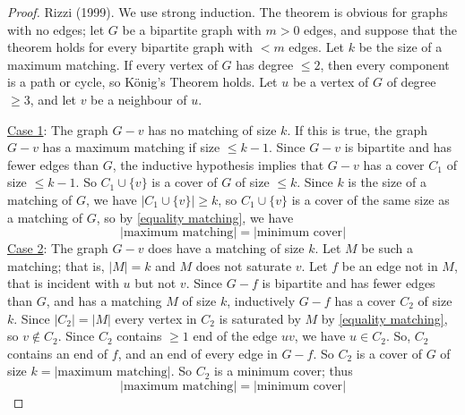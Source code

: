 \begin{proof}
    Rizzi (1999). We use strong induction.
    The theorem is obvious for graphs with no edges; let $ G $
    be a bipartite graph with $ m>0 $ edges, and suppose that the theorem holds
    for every bipartite graph with $ <m $ edges. Let $ k $ be the size of a
    maximum matching. If every vertex of $ G $ has degree $ \leqslant 2 $, then every
    component is a path or cycle, so König's Theorem holds. Let $ u $ be a vertex of
    $ G $ of degree $ \geqslant 3 $, and let $ v $ be a neighbour of $ u $.

    \underline{Case 1}: The graph $ G-v $ has no matching of size $ k $. If this is true,
    the graph $ G-v $ has a maximum matching if size $ \leqslant k-1 $. Since $ G-v $
    is bipartite and has fewer edges than $ G $, the inductive hypothesis implies that
    $ G-v $ has a cover $ C_1 $ of size $ \leqslant k-1 $. So $ C_1\cup \{v\} $
    is a cover of $ G $ of size $ \leqslant k $. Since $ k $ is the size of a matching of
    $ G $, we have $ |C_1\cup \{v\}|\geqslant k $, so $ C_1 \cup \{v\} $ is a cover
    of the same size as a matching of $ G $, so by \ref{equality matching},
    we have
    \[ |\text{maximum matching}|=|\text{minimum cover}| \]
    \underline{Case 2}: The graph $ G-v $ does have a matching of size $ k $. Let
    $ M $ be such a matching; that is, $ |M|=k $ and $ M $ does not saturate $ v $.
    Let $ f $ be an edge not in $ M $, that is incident with $ u $ but not $ v $.
    Since $ G-f $ is bipartite and has fewer edges than $ G $, and has a matching $ M $
    of size $ k $, inductively $ G-f $ has a cover $ C_2 $ of size $ k $. Since
    $ |C_2|=|M| $ every vertex in $ C_2 $ is saturated by $ M $ by \ref{equality matching},
    so $ v\notin C_2 $. Since $ C_2 $ contains $ \geqslant 1 $ end of the edge $ uv $,
    we have $ u\in C_2 $. So, $ C_2 $ contains an end of $ f $, and an end of every edge in
    $ G-f $. So $ C_2 $ is a cover of $ G $ of size $ k = |\text{maximum matching}| $.
    So $ C_2 $ is a minimum cover; thus
    \[ |\text{maximum matching}|=|\text{minimum cover}| \]
\end{proof}

